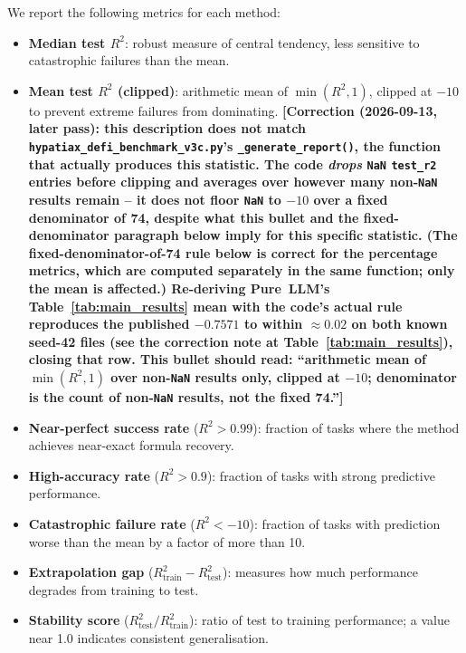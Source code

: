 \documentclass[twoside,11pt]{article}
\newcommand{\Rsq}{R^{2}}
\newcommand{\Rtrain}{R^{2}_{\mathrm{train}}}
\newcommand{\Rtest}{R^{2}_{\mathrm{test}}}
\begin{document}
We report the following metrics for each method:
\begin{itemize}
  \item \textbf{Median test $\Rsq$}: robust measure of central tendency, less
    sensitive to catastrophic failures than the mean.
  \item \textbf{Mean test $\Rsq$ (clipped)}: arithmetic mean of $\min(\Rsq, 1)$,
    clipped at $-10$ to prevent extreme failures from dominating.
    \textbf{[Correction (2026-09-13, later pass): this description does not
    match \texttt{hypatiax\_defi\_benchmark\_v3c.py}'s
    \texttt{\_generate\_report()}, the function that actually produces this
    statistic. The code \emph{drops} \texttt{NaN} \texttt{test\_r2} entries
    before clipping and averages over however many non-\texttt{NaN} results
    remain -- it does not floor \texttt{NaN} to $-10$ over a fixed
    denominator of 74, despite what this bullet and the
    fixed-denominator paragraph below imply for this specific statistic.
    (The fixed-denominator-of-74 rule below is correct for the percentage
    metrics, which are computed separately in the same function; only the
    mean is affected.) Re-deriving Pure~LLM's Table~\ref{tab:main_results}
    mean with the code's actual rule reproduces the published $-0.7571$ to
    within $\approx 0.02$ on both known seed-42 files (see the correction
    note at Table~\ref{tab:main_results}), closing that row. This bullet
    should read: ``arithmetic mean of $\min(\Rsq,1)$ over non-\texttt{NaN}
    results only, clipped at $-10$; denominator is the count of non-\texttt{NaN}
    results, not the fixed 74.'']}
  \item \textbf{Near-perfect success rate} ($\Rsq > 0.99$): fraction of tasks where
    the method achieves near-exact formula recovery.
  \item \textbf{High-accuracy rate} ($\Rsq > 0.9$): fraction of tasks with strong
    predictive performance.
  \item \textbf{Catastrophic failure rate} ($\Rsq < -10$): fraction of tasks with
    prediction worse than the mean by a factor of more than 10.
  \item \textbf{Extrapolation gap} ($\Rtrain - \Rtest$): measures how much
    performance degrades from training to test.
  \item \textbf{Stability score} ($\Rtest / \Rtrain$): ratio of test to training
    performance; a value near 1.0 indicates consistent generalisation.
\end{itemize}
\end{document}
